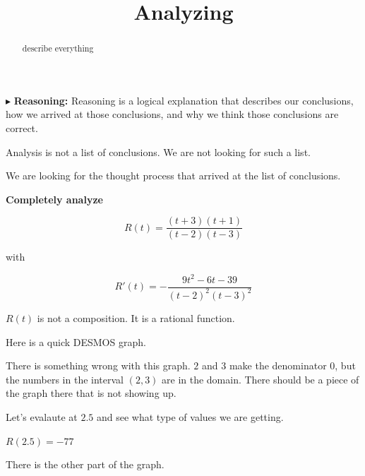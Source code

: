 \documentclass{ximera}
\title{Analyzing}
\begin{document}
\begin{abstract}
describe everything
\end{abstract}
\maketitle







$\blacktriangleright$ \textbf{\textcolor{red!80!black}{Reasoning:}} Reasoning is a logical explanation that describes our conclusions, how we arrived at those conclusions, and why we think those conclusions are correct. 

Analysis is not a list of conclusions. We are not looking for such a list. 

We are looking for the thought process that arrived at the list of conclusions. 











\textbf{\textcolor{purple!85!blue}{Completely analyze}} 


\[   R(t) = \frac{(t+3)(t+1)}{(t-2)(t-3)} \]

with 

\[   R'(t) = -\frac{9 t^2 -6 t -39}{(t-2)^2 (t-3)^2} \]



$R(t)$ is not a composition. It is a rational function. 


Here is a quick DESMOS graph.


\begin{center}
\end{center}


There is something wrong with this graph.  $2$ and $3$ make the denominator $0$, but the numbers in the interval $(2, 3)$ are in the domain.  There should be a piece of the graph there that is not showing up.


Let's evalaute at $2.5$ and see what type of values we are getting. 

$R(2.5) = -77$


\begin{center}
\end{center}


There is the other part of the graph. 
\end{document}
